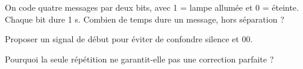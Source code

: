 \label{defi-ex-20}
\begin{questions}
\item On code quatre messages par deux bits, avec 1 = lampe allumée et 0 = éteinte. Chaque bit dure 1 s. Combien de temps dure un message, hors séparation ?
\item Proposer un signal de début pour éviter de confondre silence et 00.
\item Pourquoi la seule répétition ne garantit-elle pas une correction parfaite ?
\end{questions}
\pcGrille

